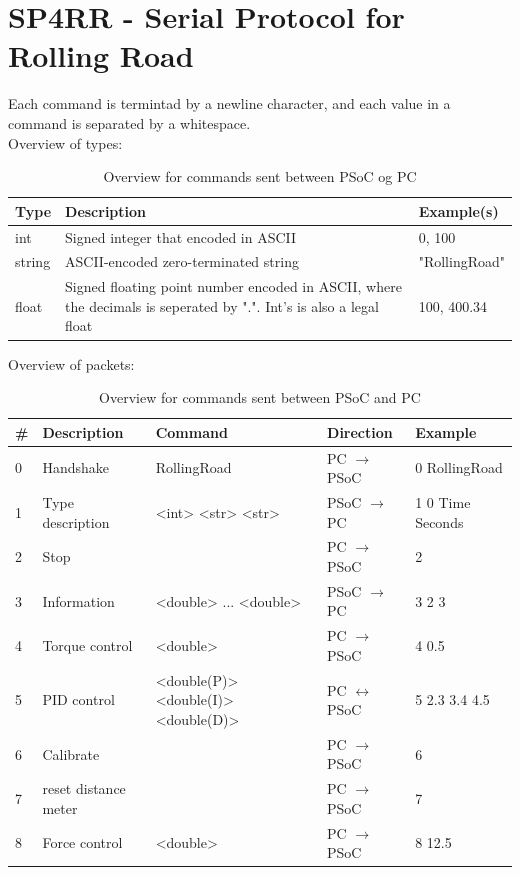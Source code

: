\section{SP4RR - Serial Protocol for Rolling Road}
Each command is termintad by a newline character, and each value in a command is separated by a whitespace. \\

Overview of types:
\begin{table}[h!]
	\centering
	\label{Protocol:typeoverview}
	\begin{tabularx}{\linewidth}{p{1.5cm}Xp{3.5cm}}
		Type 	& Description 									& Example(s)    				\\\hline
		int  	& Signed integer that encoded in ASCII			& 0, 100 						\\
		string  & ASCII-encoded zero-terminated string 			& "RollingRoad"					\\ 
		float  	& Signed floating point number encoded in ASCII, where the decimals is seperated by ".". Int's is also a legal float      		& 100, 400.34 \\
	\end{tabularx}
	\caption{Overview for commands sent between PSoC og PC}
\end{table}

Overview of packets:
\begin{table}[h!]
	\centering
	\label{Protocol:overviewRR}
	\begin{tabular}{l|llll}
		\# & Description 		& Command    		& Direction             & Example     		\\\hline
		0  & Handshake   		& RollingRoad 		& PC $\rightarrow$ PSoC & 0 RollingRoad 	\\
		1  & Type description 	& <int> <str> <str> & PSoC $\rightarrow$ PC & 1 0 Time Seconds 	\\
		2  & Stop        		&            		& PC $\rightarrow$ PSoC	& 2        			\\
		3  & Information 		& <double> ... <double>	& PSoC $\rightarrow$ PC & 3 2 3 	    	\\
		4  & Torque control 	& <double>    			& PC $\rightarrow$ PSoC & 4 0.5  				\\
		5  & PID control        & <double(P)> <double(I)> <double(D)> & PC $\leftrightarrow$ PSoC & 5 2.3 3.4 4.5 \\
		6  & Calibrate			&					& PC $\rightarrow$ PSoC & 6 \\ 
		7  & reset distance meter & 				& PC $\rightarrow$ PSoC & 7 \\ 
		8  & Force control		& <double>    			& PC $\rightarrow$ PSoC & 8 12.5  				\\
	\end{tabular}
	\caption{Overview for commands sent between PSoC and PC}
\end{table}

